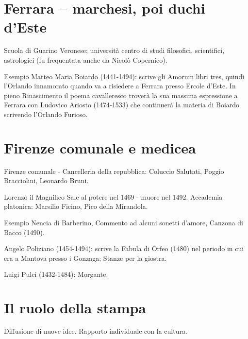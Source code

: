 \documentclass[12pt]{article}
\begin{document}
\section{Ferrara – marchesi, poi duchi d'Este}


Scuola di Guarino Veronese; università centro di studi filosofici, scientifici, astrologici (fu frequentata anche da Nicolò Copernico).


\begin{ex}{Esempio}
Matteo Maria Boiardo (1441-1494): scrive gli Amorum libri tres, quindi l'Orlando innamorato quando va a risiedere a Ferrara presso Ercole d'Este. In pieno Rinascimento il poema cavalleresco troverà la sua massima espressione a Ferrara con Ludovico Ariosto (1474-1533) che continuerà la materia di Boiardo scrivendo l'Orlando Furioso.
\end{ex}


\section{Firenze comunale e medicea}


Firenze comunale - Cancelleria della repubblica: Coluccio Salutati, Poggio Bracciolini, Leonardo Bruni.


\begin{defn}{Lorenzo il Magnifico}
Sale al potere nel 1469 - muore nel 1492. Accademia platonica: Marsilio Ficino, Pico della Mirandola.
\end{defn}


\begin{ex}{Esempio}
Nencia di Barberino, Commento ad alcuni sonetti d'amore, Canzona di Bacco (1490).
\end{ex}


\begin{defn}{Angelo Poliziano}
(1454-1494): scrive la Fabula di Orfeo (1480) nel periodo in cui era a Mantova presso i Gonzaga; Stanze per la giostra.
\end{defn}


\begin{defn}{Luigi Pulci}
(1432-1484): Morgante.
\end{defn}


\section{Il ruolo della stampa}


Diffusione di nuove idee. Rapporto individuale con la cultura.
\end{document}
